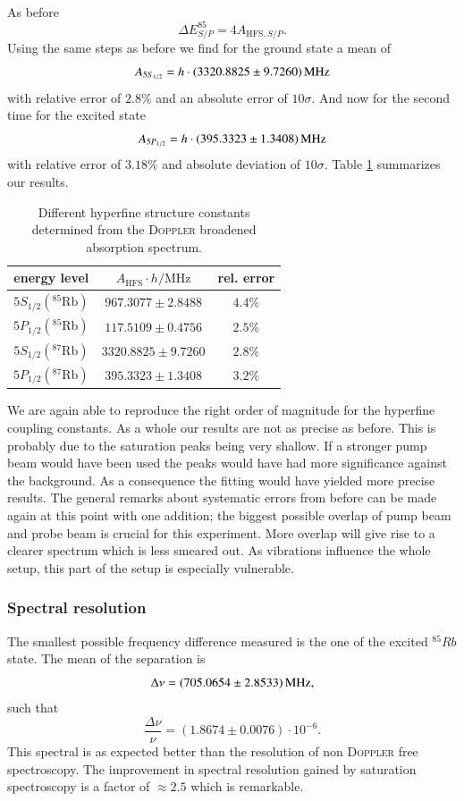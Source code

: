 \documentclass[11pt,a4paper,notitlepage]{scrartcl}
\begin{document}
\paragraph{}
As before $$\Delta E_{S/P} ^{85}=4A_{\text{HFS},S/P}.$$
Using the same steps as before we find for the ground state a mean of $$A_{5S_{1/2}}=h\cdot\SI{3320.8825\pm 9.7260}{\mega\Hz}$$ with relative error of $2.8\%$ and an absolute error of $10\sigma$.
And now for the second time for the excited state 
$$A_{5P_{1/2}}=h\cdot\SI{395.3323\pm1.3408}{\mega\Hz}$$ with relative error of $3.18\%$ and absolute deviation of $10\sigma$. Table \ref{tab:hfs1} summarizes our results.
\begin{table}[htbp]
	\centering
	\begin{tabular}{c|c|c}
		\toprule
		energy level & $A_\text{HFS} \cdot h / \si{\mega \Hz} $ & rel. error \\
		\hline
		$5S_{1/2}(^{85}\text{Rb})$& $ 967.3077\pm2.8488$& $4.4\%$\\
		$5P_{1/2}(^{85}\text{Rb})$& $ 117.5109\pm0.4756$& $2.5\%$\\
		$5S_{1/2}(^{87}\text{Rb})$& $ 3320.8825\pm 9.7260$& $2.8\%$\\
		$5P_{1/2}(^{87}\text{Rb})$& $ 395.3323\pm1.3408$& $3.2\%$\\
		\bottomrule
	\end{tabular}
	\caption{Different hyperfine structure constants determined from the \textsc{Doppler} broadened absorption spectrum.}
	\label{tab:hfs1} 
\end{table}
We are again able to reproduce the right order of magnitude for the hyperfine coupling constants. As a whole our results are not as precise as before. This is probably due to the saturation peaks being very shallow. If a stronger pump beam would have been used the peaks would have had more significance against the background. As a consequence the fitting would have yielded more precise results. The general remarks about systematic errors from before can be made again at this point with one addition; the biggest possible overlap of pump beam and probe beam is crucial for this experiment. More overlap will give rise to a clearer spectrum which is less smeared out. As vibrations influence the whole setup, this part of the setup is especially vulnerable.
\subsubsection{Spectral resolution}
The smallest possible frequency difference measured is the one of the excited $^{85}Rb$ state. The mean of the separation is $$\Delta\nu=\SI{705.0654\pm2.8533}{\mega\Hz},$$
such that $$\frac{\Delta\nu}{\nu}=(1.8674\pm0.0076)\cdot10^{-6}.$$
This spectral is as expected better than the resolution of non \textsc{Doppler} free spectroscopy. The improvement in spectral resolution gained by saturation spectroscopy is a factor of $\approx 2.5$ which is remarkable.
\end{document}
